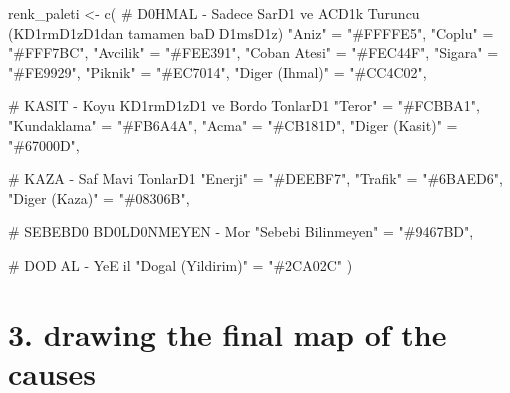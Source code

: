 \documentclass[
  11pt,
  a4paper,
  DIV=11,
  numbers=noendperiod]{scrartcl}
\newenvironment{Shaded}{\begin{snugshade}}{\end{snugshade}}
\newcommand{\CommentTok}[1]{\textcolor[rgb]{0.37,0.37,0.37}{#1}}
\newcommand{\FunctionTok}[1]{\textcolor[rgb]{0.28,0.35,0.67}{#1}}
\newcommand{\NormalTok}[1]{\textcolor[rgb]{0.00,0.23,0.31}{#1}}
\newcommand{\OtherTok}[1]{\textcolor[rgb]{0.00,0.23,0.31}{#1}}
\newcommand{\StringTok}[1]{\textcolor[rgb]{0.13,0.47,0.30}{#1}}
\begin{document}
\begin{Shaded}
\begin{Highlighting}[]
\NormalTok{renk\_paleti }\OtherTok{\textless{}{-}} \FunctionTok{c}\NormalTok{(}
  \CommentTok{\# D0HMAL {-} Sadece SarD1 ve AC\textquotesingle{}D1k Turuncu (KD1rmD1zD1dan tamamen baDD1msD1z)}
  \StringTok{"Aniz"} \OtherTok{=} \StringTok{"\#FFFFE5"}\NormalTok{, }\StringTok{"Coplu"} \OtherTok{=} \StringTok{"\#FFF7BC"}\NormalTok{, }\StringTok{"Avcilik"} \OtherTok{=} \StringTok{"\#FEE391"}\NormalTok{, }
  \StringTok{"Coban Atesi"} \OtherTok{=} \StringTok{"\#FEC44F"}\NormalTok{, }\StringTok{"Sigara"} \OtherTok{=} \StringTok{"\#FE9929"}\NormalTok{, }\StringTok{"Piknik"} \OtherTok{=} \StringTok{"\#EC7014"}\NormalTok{, }\StringTok{"Diger (Ihmal)"} \OtherTok{=} \StringTok{"\#CC4C02"}\NormalTok{,}
  
  \CommentTok{\# KASIT {-} Koyu KD1rmD1zD1 ve Bordo TonlarD1}
  \StringTok{"Teror"} \OtherTok{=} \StringTok{"\#FCBBA1"}\NormalTok{, }\StringTok{"Kundaklama"} \OtherTok{=} \StringTok{"\#FB6A4A"}\NormalTok{, }\StringTok{"Acma"} \OtherTok{=} \StringTok{"\#CB181D"}\NormalTok{, }\StringTok{"Diger (Kasit)"} \OtherTok{=} \StringTok{"\#67000D"}\NormalTok{,}
  
  \CommentTok{\# KAZA {-} Saf Mavi TonlarD1}
  \StringTok{"Enerji"} \OtherTok{=} \StringTok{"\#DEEBF7"}\NormalTok{, }\StringTok{"Trafik"} \OtherTok{=} \StringTok{"\#6BAED6"}\NormalTok{, }\StringTok{"Diger (Kaza)"} \OtherTok{=} \StringTok{"\#08306B"}\NormalTok{,}
  
  \CommentTok{\# SEBEBD0 BD0LD0NMEYEN {-} Mor}
  \StringTok{"Sebebi Bilinmeyen"} \OtherTok{=} \StringTok{"\#9467BD"}\NormalTok{,}
  
  \CommentTok{\# DODAL {-} YeEil}
  \StringTok{"Dogal (Yildirim)"} \OtherTok{=} \StringTok{"\#2CA02C"}
\NormalTok{)}
\end{Highlighting}
\end{Shaded}

\section{3. drawing the final map of the
causes}\label{drawing-the-final-map-of-the-causes}
\end{document}
